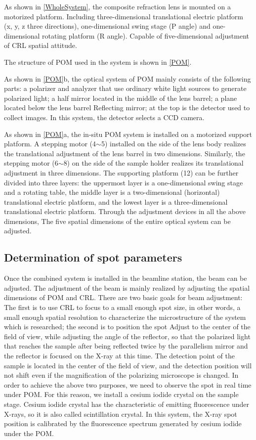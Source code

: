 \documentclass{Head}
\begin{document}
As shown in \autoref{WholeSystem}, the composite refraction lens is mounted on a motorized platform. Including three-dimensional translational electric platform (x, y, z three directions), one-dimensional swing stage (P angle) and one-dimensional rotating platform (R angle). Capable of five-dimensional adjustment of CRL spatial attitude.


The structure of POM used in the system is shown in \autoref{POM}.


As shown in \autoref{POM}b, the optical system of POM mainly consists of the following parts: a polarizer and analyzer that use ordinary white light sources to generate polarized light; a half mirror located in the middle of the lens barrel; a plane located below the lens barrel Reflecting mirror; at the top is the detector used to collect images. In this system, the detector selects a CCD camera.


As shown in \autoref{POM}a, the in-situ POM system is installed on a motorized support platform.
A stepping motor (4$\sim$5) installed on the side of the lens body realizes the translational adjustment of the lens barrel in two dimensions.
Similarly, the stepping motor (6$\sim$8) on the side of the sample holder realizes its translational adjustment in three dimensions.
The supporting platform (12) can be further divided into three layers: the uppermost layer is a one-dimensional swing stage and a rotating table, the middle layer is a two-dimensional (horizontal) translational electric platform, and the lowest layer is a three-dimensional translational electric platform.
Through the adjustment devices in all the above dimensions, The five spatial dimensions of the entire optical system can be adjusted.
\subsection{Determination of spot parameters}
Once the combined system is installed in the beamline station, the beam can be adjusted. The adjustment of the beam is mainly realized by adjusting the spatial dimensions of POM and CRL. There are two basic goals for beam adjustment: The first is to use CRL to focus to a small enough spot size, in other words, a small enough spatial resolution to characterize the microstructure of the system which is researched; the second is to position the spot Adjust to the center of the field of view, while adjusting the angle of the reflector, so that the polarized light that reaches the sample after being reflected twice by the parallelism mirror and the reflector is focused on the X-ray at this time. The detection point of the sample is located in the center of the field of view, and the detection position will not shift even if the magnification of the polarizing microscope is changed. In order to achieve the above two purposes, we need to observe the spot in real time under POM. For this reason, we install a cesium iodide crystal on the sample stage. Cesium iodide crystal has the characteristic of emitting fluorescence under X-rays, so it is also called scintillation crystal. In this system, the X-ray spot position is calibrated by the fluorescence spectrum generated by cesium iodide under the POM.
\end{document}
